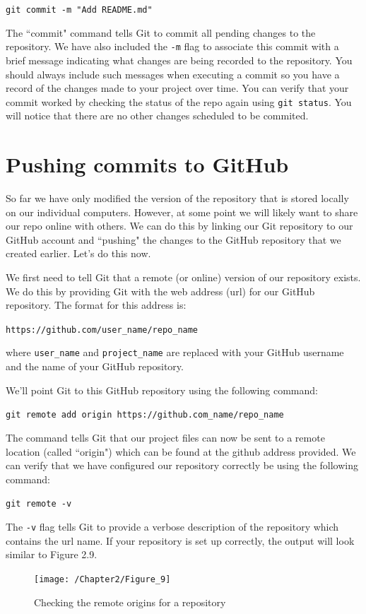\documentclass{book}
\begin{document}
\texttt{git commit -m "Add README.md"}

The ``commit" command tells Git to commit all pending changes to the repository. We have also included the \texttt{-m} flag to associate this commit with a brief message indicating what changes are being recorded to the repository. You should always include such messages when executing a commit so you have a record of the changes made to your project over time. You can verify that your commit worked by checking the status of the repo again using \texttt{git status}. You will notice that there are no other changes scheduled to be commited.

\section{Pushing commits to GitHub}
So far we have only modified the version of the repository that is stored locally on our individual computers. However, at some point we will likely want to share our repo online with others. We can do this by linking our Git repository to our GitHub account and ``pushing" the changes to the GitHub repository that we created earlier. Let's do this now.

We first need to tell Git that a remote (or online) version of our repository exists. We do this by providing Git with the web address (url) for our GitHub repository. The format for this address is:

\texttt{https://github.com/user\_name/repo\_name}

where \texttt{user\_name} and \texttt{project\_name} are replaced with your GitHub username and the name of your GitHub repository.

We'll point Git to this GitHub repository using the following command:

\texttt{git remote add origin https://github.com\_name/repo\_name}

The command tells Git that our project files can now be sent to a remote location (called ``origin") which can be found at the github address provided. We can verify that we have configured our repository correctly be using the following command:

\texttt{git remote -v}

The \texttt{-v} flag tells Git to provide a verbose description of the repository which contains the url name. If your repository is set up correctly, the output will look similar to Figure 2.9.

\begin{figure}[h]
	\caption{Checking the remote origins for a repository}
	\centering\texttt{[image: /Chapter2/Figure\_9]}
\end{figure}
\end{document}
